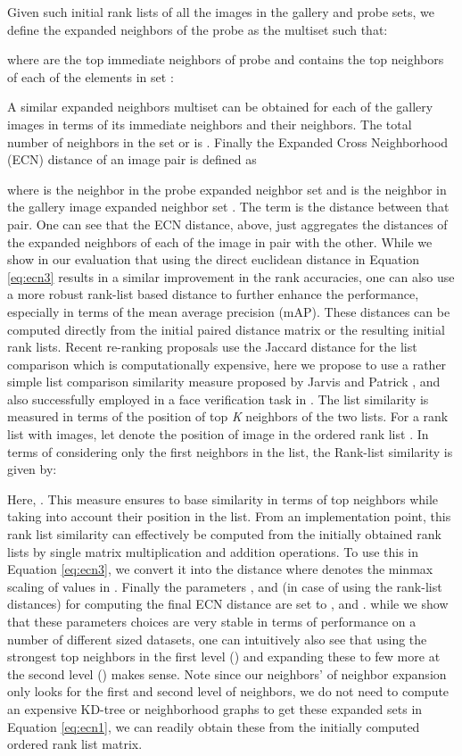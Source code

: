 \documentclass[10pt,twocolumn,letterpaper]{article}
\begin{document}
Given such initial rank lists  of all the images in the gallery and probe sets, we define the expanded neighbors of the probe  as the multiset  such that:

where  are the top  immediate neighbors of probe  and  contains the top  neighbors of each of the elements in set :


A similar expanded neighbors multiset can be obtained for each of the gallery images  in terms of its immediate neighbors and their neighbors. The total number of neighbors  in the set  or  is . Finally the Expanded Cross Neighborhood (ECN) distance of an image pair  is defined as


where  is the  neighbor in the probe expanded neighbor set  and  is the  neighbor in the  gallery image expanded neighbor set . The term  is the distance between that pair. One can see that the ECN distance, above, just aggregates the distances of the expanded neighbors of each of the image in pair with the other. While we show in our evaluation that using the direct euclidean distance in Equation \ref{eq:ecn3} results in a similar improvement in the rank accuracies, one can also use a more robust rank-list based distance to further enhance the performance, especially in terms of the mean average precision (mAP). These distances can be computed directly from the initial paired distance matrix or the resulting initial rank lists. Recent re-ranking proposals use the Jaccard distance for the list comparison which is computationally expensive, here we propose to use a rather simple list comparison similarity measure proposed by Jarvis and Patrick \cite{jarvis1973clustering}, and also successfully employed in a face verification task in \cite{schroff2011pose}. The list similarity is measured in terms of the position of top \textit{K} neighbors of the two lists. For a rank list with  images, let  denote the position of image  in the ordered rank list . In terms of considering only the first  neighbors in the list, the Rank-list similarity  is given by:


\vspace{-.5cm}


Here, . This measure ensures to base similarity in terms of top  neighbors while taking into account their position in the list. From an implementation point, this rank list similarity can effectively be computed from the initially obtained rank lists by single matrix multiplication and addition operations. To use this in Equation \ref{eq:ecn3}, we convert it into the distance  where   denotes the minmax scaling of values in . Finally the parameters ,  and  (in case of using the rank-list distances) for computing the final ECN distance are set to ,  and . while we show that these parameters choices are very stable in terms of performance on a number of different sized datasets, one can intuitively also see that using the strongest top neighbors in the first level () and expanding these to few more at the second level () makes sense. Note since our neighbors' of neighbor expansion only looks for the first and second level of neighbors, we do not need to compute an expensive KD-tree or neighborhood graphs to get these expanded sets in Equation \ref{eq:ecn1}, we can readily obtain these from the initially computed ordered rank list matrix.
\end{document}
